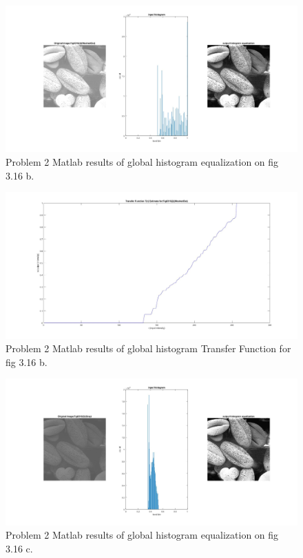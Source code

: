 \documentclass[./rarnold_report2.tex]{subfiles}
\begin{document}
	\begin{figure}[!htbp]
	\centering
	\includegraphics[scale=0.25]{"histo2"}
	\caption{Problem 2 Matlab results of global histogram equalization on fig 3.16 b.} 
	\label{histo2}
	\end{figure}
	
	\begin{figure}[!htbp]
	\centering
	\includegraphics[scale=0.25]{"transfer2"}
	\caption{Problem 2 Matlab results of global histogram Transfer Function for fig 3.16 b.} 
	\label{Tr2}
	\end{figure}
	
	\begin{figure}[!htbp]
	\centering
	\includegraphics[scale=0.25]{"histo3"}
	\caption{Problem 2 Matlab results of global histogram equalization on fig 3.16 c.} 
	\label{histo3}
	\end{figure}
	
\end{document}
